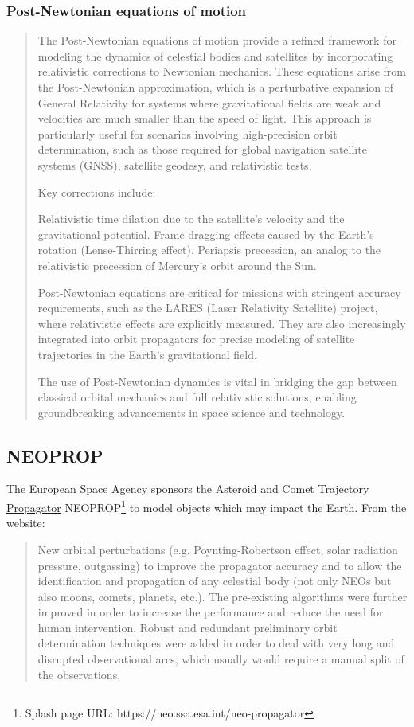 \documentclass[a4paper,10pt]{article}
\begin{document}
\subsubsection{Post-Newtonian equations of motion}
\begin{quotation}
The Post-Newtonian equations of motion provide a refined framework for modeling the dynamics of celestial bodies and satellites by incorporating relativistic corrections to Newtonian mechanics. These equations arise from the Post-Newtonian approximation, which is a perturbative expansion of General Relativity for systems where gravitational fields are weak and velocities are much smaller than the speed of light. This approach is particularly useful for scenarios involving high-precision orbit determination, such as those required for global navigation satellite systems (GNSS), satellite geodesy, and relativistic tests.

Key corrections include:

    Relativistic time dilation due to the satellite's velocity and the gravitational potential.
    Frame-dragging effects caused by the Earth's rotation (Lense-Thirring effect).
    Periapsis precession, an analog to the relativistic precession of Mercury's orbit around the Sun.

Post-Newtonian equations are critical for missions with stringent accuracy requirements, such as the LARES (Laser Relativity Satellite) project, where relativistic effects are explicitly measured. They are also increasingly integrated into orbit propagators for precise modeling of satellite trajectories in the Earth's gravitational field.

The use of Post-Newtonian dynamics is vital in bridging the gap between classical orbital mechanics and full relativistic solutions, enabling groundbreaking advancements in space science and technology.
\end{quotation}


\subsection{NEOPROP}
The \href{https://neo.ssa.esa.int/}{European Space Agency} sponsors the \href{https://neo.ssa.esa.int/neo-propagator}{Asteroid and Comet Trajectory Propagator} NEOPROP\footnote{Splash page URL: https://neo.ssa.esa.int/neo-propagator} to model objects which may impact the Earth.
From the website:
\begin{quotation}
New orbital perturbations (e.g. Poynting-Robertson effect, solar radiation pressure, outgassing) to improve the propagator accuracy and to allow the identification and propagation of any celestial body (not only NEOs but also moons, comets, planets, etc.).
The pre-existing algorithms were further improved in order to increase the performance and reduce the need for human intervention. Robust and redundant preliminary orbit determination techniques were added in order to deal with very long and disrupted observational arcs, which usually would require a manual split of the observations. 
\end{quotation}
\end{document}
